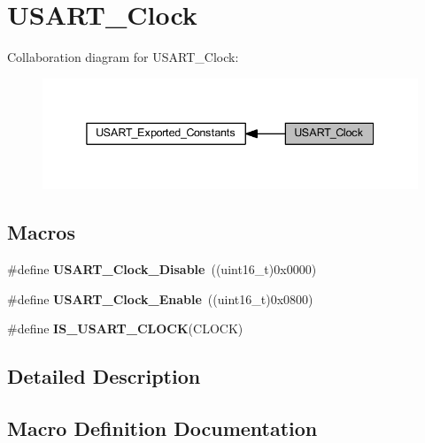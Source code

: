 \hypertarget{group___u_s_a_r_t___clock}{}\section{U\+S\+A\+R\+T\+\_\+\+Clock}
\label{group___u_s_a_r_t___clock}
Collaboration diagram for U\+S\+A\+R\+T\+\_\+\+Clock\+:
\nopagebreak
\begin{figure}[H]
\begin{center}
\leavevmode
\includegraphics[width=338pt]{group___u_s_a_r_t___clock}
\end{center}
\end{figure}
\subsection*{Macros}
\begin{DoxyCompactItemize}
\item 
\mbox{\label{group___u_s_a_r_t___clock_ga56c12b81d19853c093e0a373d0c52fb5}} 
\#define {\bfseries U\+S\+A\+R\+T\+\_\+\+Clock\+\_\+\+Disable}~((uint16\+\_\+t)0x0000)
\item 
\mbox{\label{group___u_s_a_r_t___clock_gacfe029e2ec4f49ddde031fd031654caa}} 
\#define {\bfseries U\+S\+A\+R\+T\+\_\+\+Clock\+\_\+\+Enable}~((uint16\+\_\+t)0x0800)
\item 
\#define {\bfseries I\+S\+\_\+\+U\+S\+A\+R\+T\+\_\+\+C\+L\+O\+CK}(C\+L\+O\+CK)
\end{DoxyCompactItemize}


\subsection{Detailed Description}


\subsection{Macro Definition Documentation}
\mbox{\label{group___u_s_a_r_t___clock_ga0f1e1ba37690b21b7338ed3b06614cf6}} 
